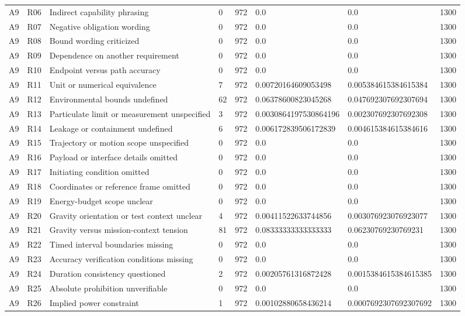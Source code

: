 \begin{tabular}{llllllll}
A9 & R06 & Indirect capability phrasing & 0 & 972 & 0.0 & 0.0 & 1300 \\
A9 & R07 & Negative obligation wording & 0 & 972 & 0.0 & 0.0 & 1300 \\
A9 & R08 & Bound wording criticized & 0 & 972 & 0.0 & 0.0 & 1300 \\
A9 & R09 & Dependence on another requirement & 0 & 972 & 0.0 & 0.0 & 1300 \\
A9 & R10 & Endpoint versus path accuracy & 0 & 972 & 0.0 & 0.0 & 1300 \\
A9 & R11 & Unit or numerical equivalence & 7 & 972 & 0.00720164609053498 & 0.005384615384615384 & 1300 \\
A9 & R12 & Environmental bounds undefined & 62 & 972 & 0.06378600823045268 & 0.047692307692307694 & 1300 \\
A9 & R13 & Particulate limit or measurement unspecified & 3 & 972 & 0.0030864197530864196 & 0.002307692307692308 & 1300 \\
A9 & R14 & Leakage or containment undefined & 6 & 972 & 0.006172839506172839 & 0.004615384615384616 & 1300 \\
A9 & R15 & Trajectory or motion scope unspecified & 0 & 972 & 0.0 & 0.0 & 1300 \\
A9 & R16 & Payload or interface details omitted & 0 & 972 & 0.0 & 0.0 & 1300 \\
A9 & R17 & Initiating condition omitted & 0 & 972 & 0.0 & 0.0 & 1300 \\
A9 & R18 & Coordinates or reference frame omitted & 0 & 972 & 0.0 & 0.0 & 1300 \\
A9 & R19 & Energy-budget scope unclear & 0 & 972 & 0.0 & 0.0 & 1300 \\
A9 & R20 & Gravity orientation or test context unclear & 4 & 972 & 0.00411522633744856 & 0.003076923076923077 & 1300 \\
A9 & R21 & Gravity versus mission-context tension & 81 & 972 & 0.08333333333333333 & 0.06230769230769231 & 1300 \\
A9 & R22 & Timed interval boundaries missing & 0 & 972 & 0.0 & 0.0 & 1300 \\
A9 & R23 & Accuracy verification conditions missing & 0 & 972 & 0.0 & 0.0 & 1300 \\
A9 & R24 & Duration consistency questioned & 2 & 972 & 0.00205761316872428 & 0.0015384615384615385 & 1300 \\
A9 & R25 & Absolute prohibition unverifiable & 0 & 972 & 0.0 & 0.0 & 1300 \\
A9 & R26 & Implied power constraint & 1 & 972 & 0.00102880658436214 & 0.0007692307692307692 & 1300 \\

\end{tabular}
